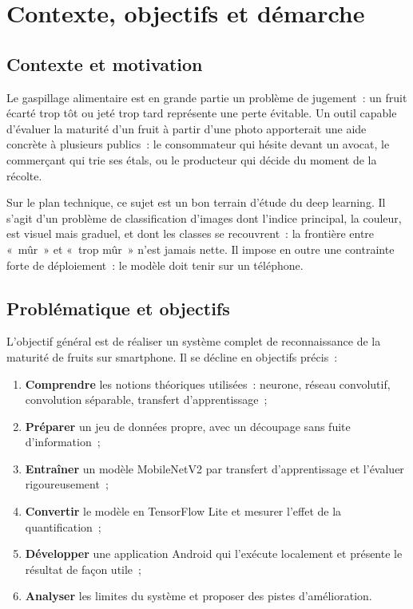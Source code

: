 \chapter{Contexte, objectifs et démarche}\label{chap:contexte}

\section{Contexte et motivation}

Le gaspillage alimentaire est en grande partie un problème de jugement~: un fruit écarté trop tôt ou jeté trop tard représente une perte évitable. Un outil capable d’évaluer la maturité d’un fruit à partir d’une photo apporterait une aide concrète à plusieurs publics~: le consommateur qui hésite devant un avocat, le commerçant qui trie ses étals, ou le producteur qui décide du moment de la récolte.

Sur le plan technique, ce sujet est un bon terrain d’étude du deep learning. Il s’agit d’un problème de classification d’images dont l’indice principal, la couleur, est visuel mais graduel, et dont les classes se recouvrent~: la frontière entre «~mûr~» et «~trop mûr~» n’est jamais nette. Il impose en outre une contrainte forte de déploiement~: le modèle doit tenir sur un téléphone.

\section{Problématique et objectifs}

L’objectif général est de réaliser un système complet de reconnaissance de la maturité de fruits sur smartphone. Il se décline en objectifs précis~:

\begin{enumerate}
  \item \textbf{Comprendre} les notions théoriques utilisées~: neurone, réseau convolutif, convolution séparable, transfert d’apprentissage~;
  \item \textbf{Préparer} un jeu de données propre, avec un découpage sans fuite d’information~;
  \item \textbf{Entraîner} un modèle MobileNetV2 par transfert d’apprentissage et l’évaluer rigoureusement~;
  \item \textbf{Convertir} le modèle en TensorFlow Lite et mesurer l’effet de la quantification~;
  \item \textbf{Développer} une application Android qui l’exécute localement et présente le résultat de façon utile~;
  \item \textbf{Analyser} les limites du système et proposer des pistes d’amélioration.
\end{enumerate}

